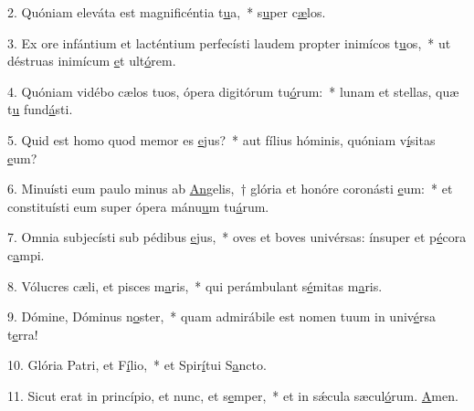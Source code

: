 2. Quóniam eleváta est magnificéntia t\uline{u}a,~* s\uline{u}per c\uline{æ}los.\par 
3. Ex ore infántium et lacténtium perfecísti laudem propter inimícos t\uline{u}os,~* ut déstruas inimícum \uline{e}t ult\uline{ó}rem.\par 
4. Quóniam vidébo cælos tuos, ópera digitórum tu\uline{ó}rum:~* lunam et stellas, quæ t\uline{u} fund\uline{á}sti.\par 
5. Quid est homo quod memor es \uline{e}jus?~* aut fílius hóminis, quóniam v\uline{í}sitas \uline{e}um?\par 
6. Minuísti eum paulo minus ab \uline{An}gelis,~† glória et honóre coronásti \uline{e}um:~* et constituísti eum super ópera mánu\uline{u}m tu\uline{á}rum.\par 
7. Omnia subjecísti sub pédibus \uline{e}jus,~* oves et boves univérsas: ínsuper et p\uline{é}cora c\uline{a}mpi.\par 
8. Vólucres cæli, et pisces m\uline{a}ris,~* qui perámbulant s\uline{é}mitas m\uline{a}ris.\par 
9. Dómine, Dóminus n\uline{o}ster,~* quam admirábile est nomen tuum in univ\uline{é}rsa t\uline{e}rra!\par 
10. Glória Patri, et F\uline{í}lio,~* et Spir\uline{í}tui S\uline{a}ncto.\par 
11. Sicut erat in princípio, et nunc, et s\uline{e}mper,~* et in sǽcula sæcul\uline{ó}rum. \uline{A}men.\par 
